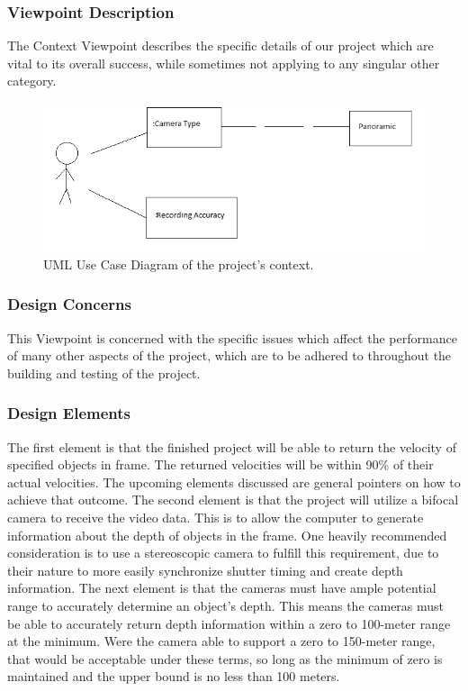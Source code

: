 \documentclass[letterpaper,10pt,onecolumn,draftclsnofoot]{IEEEtran}
\begin{document}
\subsubsection{Viewpoint Description}
The Context Viewpoint describes the specific details of our project which are vital to its overall success, while sometimes not applying to any singular other category.

\begin{figure}[H]
\includegraphics[scale=.8]{context-uml}
\caption{UML Use Case Diagram of the project's context.}
\label{fig:context}
\end{figure}

\subsubsection{Design Concerns}
This Viewpoint is concerned with the specific issues which affect the performance of many other aspects of the project, which are to be adhered to throughout the building and testing of the project.

\subsubsection{Design Elements}
The first element is that the finished project will be able to return the velocity of specified objects in frame.
The returned velocities will be within 90\% of their actual velocities.
The upcoming elements discussed are general pointers on how to achieve that outcome.
The second element is that the project will utilize a bifocal camera to receive the video data.
This is to allow the computer to generate information about the depth of objects in the frame.
One heavily recommended consideration is to use a stereoscopic camera to fulfill this requirement, due to their nature to more easily synchronize shutter timing and create depth information.
The next element is that the cameras must have ample potential range to accurately determine an object's depth.
This means the cameras must be able to accurately return depth information within a zero to 100-meter range at the minimum.
Were the camera able to support a zero to 150-meter range, that would be acceptable under these terms, so long as the minimum of zero is maintained and the upper bound is no less than 100 meters.
\end{document}
